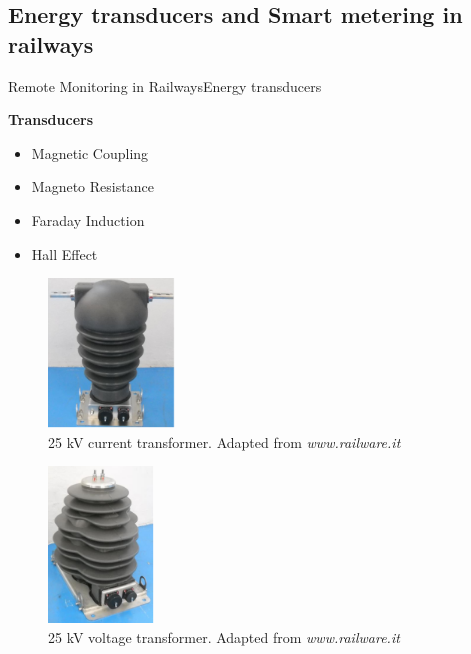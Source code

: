 \subsection{Energy transducers and Smart metering in railways}

\begin{frame}{Remote Monitoring in Railways}{Energy transducers}
	\begin{block}{\textbf{Transducers}}
	
	\begin{minipage}[t]{0.48\linewidth}
		\vspace{5em}
	\begin{itemize}
		\item Magnetic Coupling
		\item Magneto Resistance
		\item Faraday Induction
		\item Hall Effect
	\end{itemize}
	\end{minipage}\hfill
	\begin{minipage}[t]{0.48\linewidth}
		
		
		\begin{figure}[ht!]
			\centering
			\includegraphics[width=0.30\textwidth,keepaspectratio]{figures/32.EnergyS/current_t}
			\caption{25 kV current transformer. Adapted from \textit{www.railware.it}}
		\end{figure}
		
			\begin{figure}[ht!]
			\centering
			\vspace{-3em}
			\includegraphics[width=0.25\textwidth,keepaspectratio]{figures/32.EnergyS/voltage_t}
			\caption{25 kV voltage transformer. Adapted from \textit{www.railware.it}}
		\end{figure}
		
		
	\end{minipage}
	

		
	\end{block}
\end{frame}
